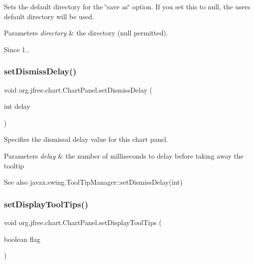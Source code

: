 Sets the default directory for the \char`\"{}save as\char`\"{} option. If you set this to {\ttfamily null}, the user\textquotesingle{}s default directory will be used.


\begin{DoxyParams}{Parameters}
{\em directory} & the directory ({\ttfamily null} permitted).\\
\hline
\end{DoxyParams}
\begin{DoxySince}{Since}
1.. 
\end{DoxySince}
\mbox{\label{classorg_1_1jfree_1_1chart_1_1_chart_panel_a307cbf4935c44eb969d06ed50dd0c261}} 
\subsubsection{\texorpdfstring{set\+Dismiss\+Delay()}{setDismissDelay()}}
{\footnotesize\ttfamily void org.\+jfree.\+chart.\+Chart\+Panel.\+set\+Dismiss\+Delay (\begin{DoxyParamCaption}\item[{int}]{delay }\end{DoxyParamCaption})}

Specifies the dismissal delay value for this chart panel.


\begin{DoxyParams}{Parameters}
{\em delay} & the number of milliseconds to delay before taking away the tooltip\\
\hline
\end{DoxyParams}
\begin{DoxySeeAlso}{See also}
javax.\+swing.\+Tool\+Tip\+Manager\+::set\+Dismiss\+Delay(int) 
\end{DoxySeeAlso}
\mbox{\label{classorg_1_1jfree_1_1chart_1_1_chart_panel_a99c62a1da7a8cfa274ee0b109a47e100}} 
\subsubsection{\texorpdfstring{set\+Display\+Tool\+Tips()}{setDisplayToolTips()}}
{\footnotesize\ttfamily void org.\+jfree.\+chart.\+Chart\+Panel.\+set\+Display\+Tool\+Tips (\begin{DoxyParamCaption}\item[{boolean}]{flag }\end{DoxyParamCaption})}


